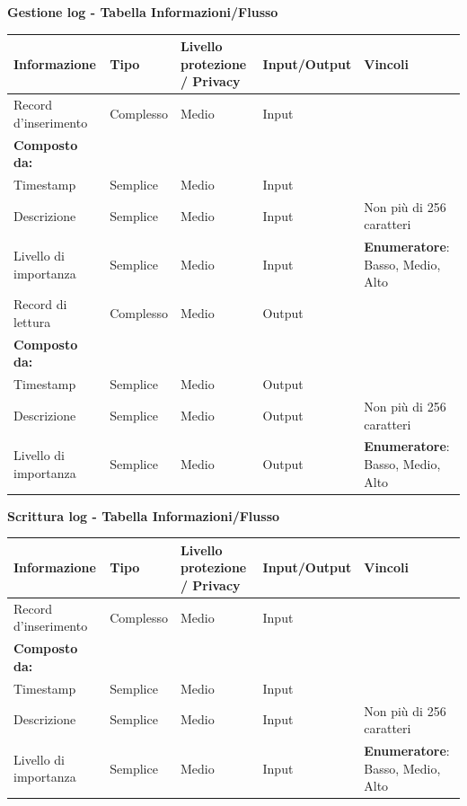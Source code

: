 \documentclass[a4paper]{article}
\begin{document}
\textbf{Gestione log  - Tabella Informazioni/Flusso}

\begin{center}
    \begin{tabularx}{1\textwidth}{|X|l|X|X|X|}
        \hline
        \textbf{Informazione} &\textbf{Tipo} & \textbf{Livello protezione / Privacy} & \textbf{Input/Output} & \textbf{Vincoli}\\
        \hline
        \hline
        Record d'inserimento & Complesso & Medio & Input & \\
        \textbf{Composto da:} & & & & \\
        Timestamp & Semplice & Medio & Input & \\
        Descrizione & Semplice & Medio & Input & Non più di 256 caratteri \\
        Livello di importanza & Semplice & Medio & Input & \textbf{Enumeratore}: Basso, Medio, Alto\\
        \hline
        Record di lettura & Complesso & Medio & Output & \\
        \textbf{Composto da:} & & & & \\
        Timestamp & Semplice & Medio & Output & \\
        Descrizione & Semplice & Medio & Output & Non più di 256 caratteri \\
        Livello di importanza & Semplice & Medio & Output & \textbf{Enumeratore}: Basso, Medio, Alto\\
        \hline
    \end{tabularx}
\end{center}

\textbf{Scrittura log  - Tabella Informazioni/Flusso}

\begin{center}
    \begin{tabularx}{1\textwidth}{|X|l|X|X|X|}
        \hline
        \textbf{Informazione} &\textbf{Tipo} & \textbf{Livello protezione / Privacy} & \textbf{Input/Output} & \textbf{Vincoli}\\
        \hline
        \hline
        Record d'inserimento & Complesso & Medio & Input & \\
        \textbf{Composto da:} & & & & \\
        Timestamp & Semplice & Medio & Input & \\
        Descrizione & Semplice & Medio & Input & Non più di 256 caratteri \\
        Livello di importanza & Semplice & Medio & Input & \textbf{Enumeratore}: Basso, Medio, Alto\\
        \hline
    \end{tabularx}
\end{center}
\end{document}
